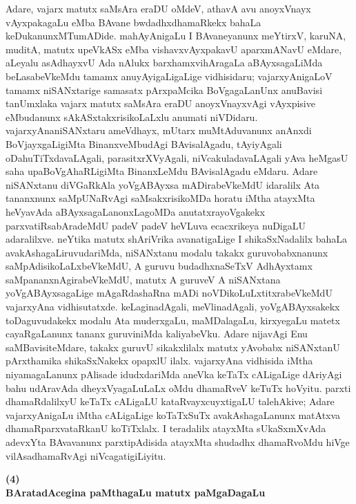Adare, vajarx matutx saMsAra eraDU oMdeV, athavA avu anoyxVnayx vAyxpaka\-gaLu eMba BAvane bwdadhxdhamaRkekx bahaLa keDukanunxMTumADide. mahAyAnigaLu I BAvaneyanunx meYtirxV, karuNA, muditA, matutx upeVkASx eMba vishavxvAyxpakavU aparxmANavU eMdare, aLeyalu asAdhayxvU Ada nAlukx barxhamxvihAragaLa aBAyxsa\-gaLiMda beLasabeVkeMdu tamamx anuyAyigaLigaLige vidhisidaru; vajarxyAnigaLoV tamamx niSANxtarige samasatx pArxpaMcika BoVgagaLanUnx anuBavisi tanUmxlaka vajarx matutx saMsAra eraDU anoyxVnayxvAgi vAyxpisive eMbudanunx sAkASxtakxrisikoLaLxlu anumati niVDi\-daru. vajarxyAnaniSANxtaru ameVdhayx, mUtarx muMtAduvanunx anAnxdi BoVjayxgaLigiMta Binanx\-veMbudAgi BAvisalAgadu, tAyiyAgali oDahuTiTxdavaLAgali, parasitxrXVyAgali, niVcakuladavaLAgali yAva heMgasU saha upaBoVgAhaRLigiMta BinanxLeMdu BAvisa\-lAgadu eMdaru. Adare niSANxtanu diVGaRkAla yoVgABAyxsa mADirabeVkeMdU idaralilx Ata tananxnunx saMpUNaRvAgi saMsakxrisikoMDa horatu iMtha atayxMta heVya\-vAda aBAyxsagaLanonxLagoMDa anutatxrayoVgakekx parxvatiRsabAradeMdU padeV padeV heVLuva ecacxrikeya nuDigaLU adaralilxve. neYtika matutx shAriVrika avanatigaLige I shikaSxNa\-dalilx bahaLa avakAshagaLiruvudariMda, niSANxtanu modalu takakx guruvobabxnanunx saMpA\-disikoLaLxbeVkeMdU, A guruvu budadhxnaSeTxV AdhAyxtamx saMpananxnAgirabeVkeMdU, matutx A guruveV A niSANxtana yoVgABAyxsagaLige mAgaRdashaRna mADi noVDikoLuLx\-titxrabeVkeMdU vajarxyAna vidhisutatxde. keLaginadAgali, meVlinadAgali, yoVgABAyxsakekx toDaguvudakekx modalu Ata muderxgaLu, maMDalagaLu, kirxyegaLu matetx cayaR\-gaLanunx tananx guruviniMda kaliyabeVku. Adare nijavAgi Enu saMBavisiteMdare, takakx \hbox{guruvU} sikakxlilalx matutx yAvobabx niSANxtanU pArxthamika shikaSxNakekx opapxlU ilalx. vajarxyAna vidhi\-sida iMtha niyamagaLanunx pAlisade idudxdariMda aneVka keTaTx cALigaLige dAriyAgi bahu udAravAda dheyxVyagaLuLaLx oMdu dhamaRveV keTuTx hoVyitu. parxti dhamaR\-dalilxyU keTaTx cALigaLU kataRvayxcuyxtigaLU talehAkive; Adare vajarxyAnigaLu iMtha cALigaLige koTaTxSuTx avakAshagaLanunx matAtxva dhamaRparxvataRkanU koTiTxlalx. I teradalilx atayxMta sUkaSxmXvAda adevxYta BAvavanunx parxtipAdisida atayxMta shudadhx dhamaRvoMdu hiVge vilAsadhamaRvAgi niVcagatigiLiyitu.

\newpage

\begin{center}
{\textbf{\Large (4)}}\\[5pt]
{\textbf{\Large BAratadAcegina paMthagaLu matutx paMgaDagaLu}}
\end{center}

